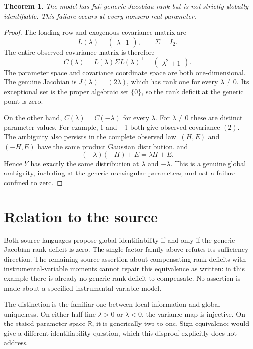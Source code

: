 \documentclass[11pt]{article}
\newtheorem{theorem}{Theorem}
\begin{document}
\begin{theorem}
The model has full generic Jacobian rank but is not strictly globally
identifiable. This failure occurs at every nonzero real parameter.
\end{theorem}
\begin{proof}
The loading row and exogenous covariance matrix are
\[
 L(\lambda)=\begin{pmatrix}\lambda&1\end{pmatrix},\qquad
 \Sigma=I_2.
\]
The entire observed covariance matrix is therefore
\[
 C(\lambda)=L(\lambda)\Sigma L(\lambda)^{\mathsf T}
           =\begin{pmatrix}\lambda^2+1\end{pmatrix}.
\]
The parameter space and covariance coordinate space are both
one-dimensional. The genuine Jacobian is
$J(\lambda)=(2\lambda)$, which has rank one for every $\lambda\ne0$.
Its exceptional set is the proper algebraic set $\{0\}$, so the rank
deficit at the generic point is zero.

On the other hand, $C(\lambda)=C(-\lambda)$ for every $\lambda$.
For $\lambda\ne0$ these are distinct parameter values. For example,
$1$ and $-1$ both give observed covariance $(2)$.
The ambiguity also persists in the complete observed law:
$(H,E)$ and $(-H,E)$ have the same product Gaussian distribution,
and
\[
 (-\lambda)(-H)+E=\lambda H+E.
\]
Hence $Y$ has exactly the same distribution at $\lambda$ and
$-\lambda$. This is a genuine global ambiguity, including at the
generic nonsingular parameters, and not a failure confined to zero.
\end{proof}

\section*{Relation to the source}
Both source languages propose global identifiability if and only if
the generic Jacobian rank deficit is zero. The single-factor family
above refutes its sufficiency direction. The remaining source assertion
about compensating rank deficits with instrumental-variable moments
cannot repair this equivalence as written: in this example there is
already no generic rank deficit to compensate. No assertion is made
about a specified instrumental-variable model.

The distinction is the familiar one between local information and
global uniqueness. On either half-line $\lambda>0$ or $\lambda<0$,
the variance map is injective. On the stated parameter space
$\mathbb R$, it is generically two-to-one. Sign equivalence would give
a different identifiability question, which this disproof explicitly
does not address.
\end{document}
